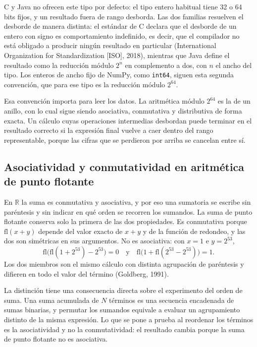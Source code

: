 C y Java no ofrecen este tipo por defecto: el tipo entero habitual tiene 32 o 64 bits fijos, y un
resultado fuera de rango desborda. Las dos familias resuelven el desborde de manera distinta: el
estándar de C declara que el desborde de un entero con signo es comportamiento indefinido, es decir,
que el compilador no está obligado a producir ningún resultado en particular (International
Organization for Standardization [ISO], 2018), mientras que Java define el resultado como la
reducción módulo $2^{n}$ en complemento a dos, con $n$ el ancho del tipo. Los enteros de ancho fijo
de NumPy, como \texttt{int64}, siguen esta segunda convención, que para ese tipo es la reducción
módulo $2^{64}$.

Esa convención importa para leer los datos. La
aritmética módulo $2^{64}$ es la de un anillo, con lo cual sigue siendo asociativa, conmutativa y
distributiva de forma exacta. Un cálculo cuyas operaciones intermedias desbordan puede terminar en
el resultado correcto si la expresión final vuelve a caer dentro del rango representable, porque las
cifras que se perdieron por arriba se cancelan entre sí.

\subsection{Asociatividad y conmutatividad en aritmética de punto flotante}
\label{subsec:asociatividad}

En $\mathbb{R}$ la suma es conmutativa y asociativa, y por eso una sumatoria se escribe sin
paréntesis y sin indicar en qué orden se recorren los sumandos. La suma de punto flotante conserva
solo la primera de las dos propiedades. Es conmutativa porque $\mathrm{fl}(x + y)$ depende del valor
exacto de $x + y$ y de la función de redondeo, y las dos son simétricas en sus argumentos. No es
asociativa: con $x = 1$ e $y = 2^{53}$,
\begin{equation}
  \mathrm{fl}\bigl(\mathrm{fl}(1 + 2^{53}) - 2^{53}\bigr) = 0
  \quad\text{y}\quad
  \mathrm{fl}\bigl(1 + \mathrm{fl}(2^{53} - 2^{53})\bigr) = 1 .
  \label{eq:contraejemplo}
\end{equation}
Los dos miembros son el mismo cálculo con distinta agrupación de paréntesis y difieren en todo el
valor del término (Goldberg, 1991).

La distinción tiene una consecuencia directa sobre el experimento del orden de suma. Una suma
acumulada de $N$ términos es una secuencia encadenada de sumas binarias, y permutar los sumandos
equivale a evaluar un agrupamiento distinto de la misma expresión. Lo que se pone a prueba al
reordenar los términos es la asociatividad y no la conmutatividad: el resultado cambia porque la
suma de punto flotante no es asociativa.

